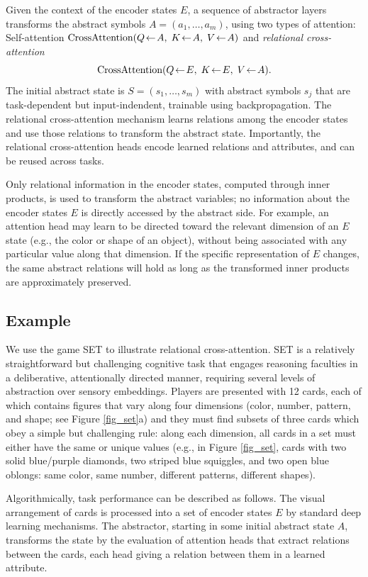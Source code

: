 Given the context of the encoder states $E$, a sequence of abstractor layers transforms the abstract symbols $A = (a_1,\ldots, a_m)$, using two types of attention: Self-attention $\mbox{CrossAttention}(Q\!\leftarrow\!A,\; K\!\leftarrow\!A,\; V\!\leftarrow\!A)$ and
\textit{relational cross-attention}
\begin{equation*}
    \qkv{E}{E}{A}.
\end{equation*}
The initial abstract state is $S = (s_1,\ldots, s_m)$
with abstract symbols $s_j$ that are task-dependent but input-indendent, trainable using
backpropagation. The relational cross-attention mechanism learns relations among the encoder states and use those relations to transform the abstract state. Importantly, the relational cross-attention heads
encode learned relations and attributes, and can be reused across tasks.


Only relational information in the encoder states, computed through inner products,
is used to transform the abstract variables; no information about the encoder states $E$ is directly accessed by the abstract side. For example, an attention head may learn to be directed toward the relevant dimension of an $E$ state (e.g., the color or shape of an object), without being associated with any particular value along that dimension. If the specific representation of $E$ changes, the same abstract relations will hold as long as the transformed inner products are approximately preserved.



\subsection{Example}

We use the game SET to illustrate relational cross-attention. SET is a relatively straightforward but challenging cognitive task that engages reasoning faculties in a deliberative, attentionally directed manner, requiring several levels of abstraction over sensory embeddings. Players are presented with 12 cards, each of which contains figures that vary along four dimensions (color, number, pattern, and shape; see Figure \ref{fig_set}a) and they must find subsets of three cards which obey a simple but challenging rule: along each dimension, all cards in a set must either have the same or unique values (e.g., in Figure \ref{fig_set}, cards with two solid blue/purple diamonds, two striped blue squiggles, and two open blue oblongs: same color, same number, different patterns, different shapes).

Algorithmically, task performance can be described as follows. The visual arrangement of cards is processed into a set of encoder states $E$ by standard deep learning mechanisms. The abstractor, starting in some initial abstract state $A$, transforms the state by the evaluation of attention heads that extract relations between the cards, each head giving a relation between them in a learned attribute.

